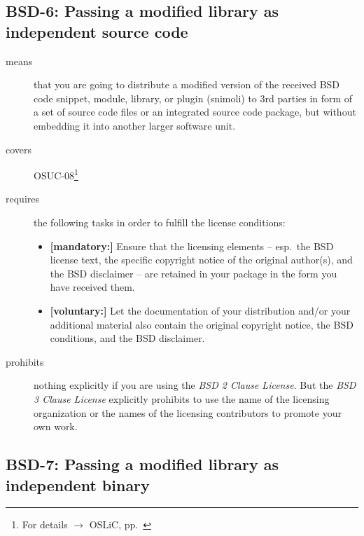 \subsection{BSD-6: Passing a modified library as independent source code}
\label{OSUC-08-BSD}
\begin{description}
\item[means] that you are going to distribute a modified version of the received
BSD code snippet, module, library, or plugin (snimoli) to 3rd parties in form
of a set of source code files or an integrated source code package, but without
embedding it into another larger software unit.
\item[covers] OSUC-08\footnote{For details $\rightarrow$ OSLiC, pp.\ \pageref{OSUC-08-DEF}}
\item[requires] the following tasks in order to fulfill the license conditions:
\begin{itemize}
  \item \textbf{[mandatory:]} Ensure that the licensing elements -- esp.\ the
  BSD license text, the specific copyright notice of the original author(s), and
  the BSD disclaimer -- are retained in your package in the form you have
  received them.
  \item \textbf{[voluntary:]} Let the documentation of your distribution
  and/or your additional material also contain the original copyright notice, the
  BSD conditions, and the BSD disclaimer.
\end{itemize}

\item[prohibits] nothing explicitly if you are using the \emph{BSD 2 Clause
License}. But the \emph{BSD 3 Clause License} explicitly prohibits to use the
name of the licensing organization or the names of the licensing contributors to
promote your own work.

\end{description}


\subsection{BSD-7: Passing a modified library as independent binary}

